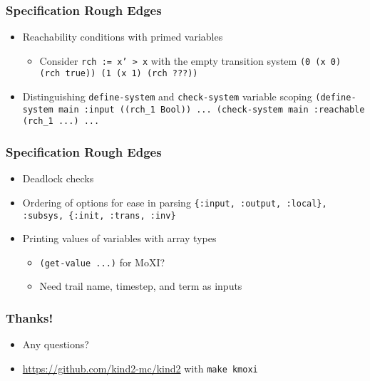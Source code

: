 \documentclass[11pt,xcolor={dvipsnames},hyperref={pdftex,pdfpagemode=UseNone,hidelinks,pdfdisplaydoctitle=true},usepdftitle=false]{beamer}
\newcommand{\code}[1]{{\footnotesize\texttt{#1}}}
\begin{document}
\begin{frame}
    \frametitle{Specification Rough Edges}
    \begin{itemize}
        \item Reachability conditions with primed variables \pause
        \begin{itemize}
            \item Consider \code{rch := x' > x} with the empty transition system \newline 
            \code{(0 (x 0) (rch true)) \newline
            (1 (x 1) (rch ???))}
        \end{itemize} \pause
            \item Distinguishing \code{define-system} and \code{check-system} variable scoping \pause \newline 
            \code{(define-system main :input ((rch\_1 Bool)) ...  \newline
         (check-system main :reachable (rch\_1 ...) ...}
    \end{itemize}
\end{frame}

\begin{frame}
    \frametitle{Specification Rough Edges}
    \begin{itemize}
        \item Deadlock checks \pause
        \item Ordering of options for ease in parsing\pause\newline 
        \code{\{:input, :output, :local\}, \newline :subsys, \newline \{:init, :trans, :inv\}} \pause
        \item Printing values of variables with array types\pause
        \begin{itemize}
            \item \code{(get-value ...)} for MoXI?
            \item Need trail name, timestep, and term as inputs
        \end{itemize}
    \end{itemize}
\end{frame}

\begin{frame}
    \frametitle{Thanks!}
    \begin{itemize}
        \item Any questions?
        \item \footnotesize{\url{https://github.com/kind2-mc/kind2}} \newline with \code{make kmoxi}
    \end{itemize}
\end{frame} 
\end{document}
